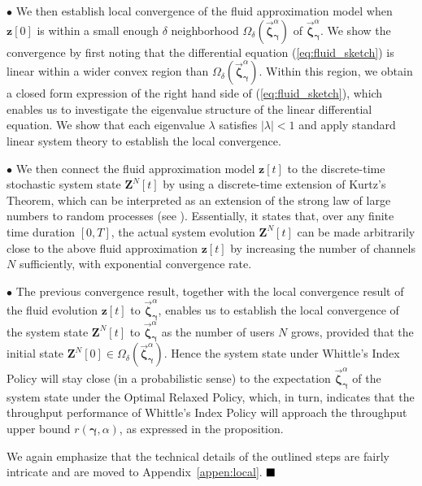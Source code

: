 \documentclass[11pt,twocolumn]{IEEEtran}
\begin{document}
$\bullet$ We then establish local convergence of the fluid
approximation model when ${\bm z}[0]$ is within a small enough
$\delta$ neighborhood $\Omega_{\delta}(\vec{\bm \zeta}^{\alpha}_{\bm
\gamma})$ of $\vec{\bm \zeta}^{\alpha}_{\bm \gamma}$. We show the
convergence by first noting that the differential equation
(\ref{eq:fluid_sketch}) is linear within a wider convex region than
$\Omega_{\delta}(\vec{\bm \zeta}^{\alpha}_{\bm \gamma})$. Within
this region, we obtain a closed form expression of the right hand
side of (\ref{eq:fluid_sketch}), which enables us to investigate the
eigenvalue structure of the linear differential equation. We show
{that each eigenvalue $\lambda$ satisfies $|\lambda|< 1$} and apply standard linear
system theory to establish the local convergence.

$\bullet$ We then connect the fluid approximation model ${\bm z}[t]$
to the discrete-time stochastic system state ${\bm Z}^N[t]$ by using a discrete-time extension of
Kurtz's Theorem, which can be interpreted as an
extension of the strong law of large numbers to random processes
(see \cite{Weiss_LD}). Essentially, it states that, over any finite
time duration $[0,T]$, the actual
system evolution ${\bm Z}^N[t]$ can be made arbitrarily close
to the above fluid approximation ${\bm z}[t]$ by increasing the
number of channels $N$ sufficiently, {with exponential convergence rate}.

$\bullet$ The previous convergence result, together with the local convergence
result of the fluid evolution ${\bm z}[t]$ to $\vec{\bm
\zeta}^{\alpha}_{\bm \gamma}$, enables us to establish the local
convergence of the system state ${\bm Z}^N[t]$ to $\vec{\bm
\zeta}^{\alpha}_{\bm \gamma}$ as the number of users $N$ grows,
provided that the initial state ${\bm Z}^N[0] \in \Omega_{\delta}(\vec{\bm
\zeta}^{\alpha}_{\bm \gamma})$.
Hence the system state under Whittle's Index Policy will stay close
(in a probabilistic sense) to the expectation $\vec{\bm
\zeta}^{\alpha}_{\bm \gamma}$ of the system state under the Optimal
Relaxed Policy, which, in turn, indicates that the throughput
performance of Whittle's Index Policy will approach the throughput
upper bound $r(\bm \gamma, \alpha)$, as expressed in the
proposition.

We again emphasize that the technical details of the outlined steps
are fairly intricate and are moved to Appendix~\ref{appen:local}. $\hfill \blacksquare$ \vspace{5pt}
\end{document}
